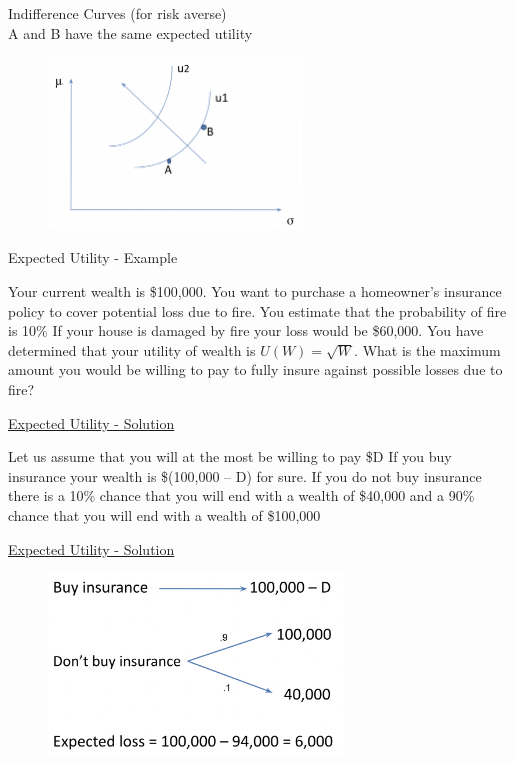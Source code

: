 \documentclass[
14pt,notheorems,hyperref={pdfauthor=whatever}
]{beamer}
\begin{document}
\begin{frame}
Indifference Curves (for risk averse)\\
\hfill \break
A and B have the same expected utility
\begin{figure}[exponential]
    \includegraphics[width=0.6\textwidth]{L1-indiff}
    \centering
\end{figure}
\end{frame}

\begin{frame}
Expected Utility - Example
\hfill \break
\begin{outline}
    \1 Your current wealth is \$100,000.
    \1 You want to purchase a homeowner’s insurance policy to cover potential loss due to fire.
    \1 You estimate that the probability of fire is 10\%
    \1 If your house is damaged by fire your loss would be \$60,000. 
    \1 You have determined that your utility of wealth is $U(W) = \sqrt{W}$. 
    \1 What is the maximum amount you would be willing to pay to fully insure against possible losses due to fire?
\end{outline}
\end{frame}

\begin{frame}
\underline{Expected Utility - Solution}
\hfill \break
\begin{outline}
    \1 Let us assume that you will at the most be willing to pay \$D\break
    \1 If you buy insurance your wealth is \$(100,000 – D) for sure.\break
    \1 If you do not buy insurance there is a 10\% chance that you will end with a wealth of \$40,000 and a 90\% chance that you will end with a wealth of \$100,000\break
\end{outline}
\end{frame}

\begin{frame}
\underline{Expected Utility - Solution}\\
\begin{figure}[ex-util]
    \includegraphics[width=0.7\textwidth]{L1-ex-util}
    \centering
\end{figure}
\end{frame}
\end{document}
